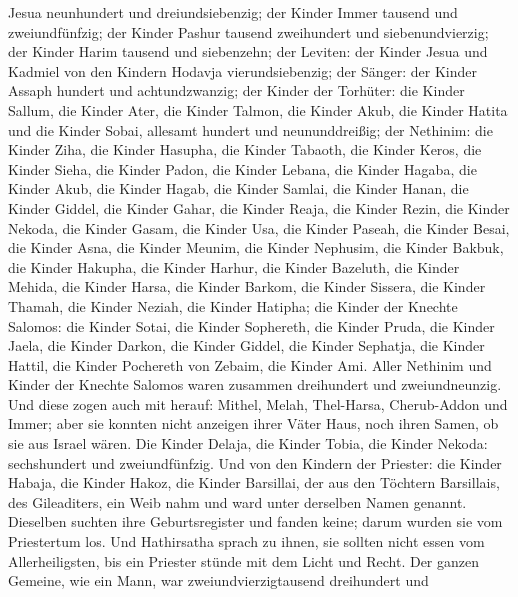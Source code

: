 Jesua neunhundert und dreiundsiebenzig;  der Kinder Immer
tausend und zweiundfünfzig;  der Kinder Pashur tausend
zweihundert und siebenundvierzig;  der Kinder Harim tausend
und siebenzehn;  der Leviten: der Kinder Jesua und Kadmiel
von den Kindern Hodavja vierundsiebenzig;  der Sänger: der
Kinder Assaph hundert und achtundzwanzig;  der Kinder der
Torhüter: die Kinder Sallum, die Kinder Ater, die Kinder Talmon, die
Kinder Akub, die Kinder Hatita und die Kinder Sobai, allesamt hundert
und neununddreißig;  der Nethinim: die Kinder Ziha, die
Kinder Hasupha, die Kinder Tabaoth,  die Kinder Keros, die
Kinder Sieha, die Kinder Padon,  die Kinder Lebana, die
Kinder Hagaba, die Kinder Akub,  die Kinder Hagab, die
Kinder Samlai, die Kinder Hanan,  die Kinder Giddel, die
Kinder Gahar, die Kinder Reaja,  die Kinder Rezin, die
Kinder Nekoda, die Kinder Gasam,  die Kinder Usa, die
Kinder Paseah, die Kinder Besai,  die Kinder Asna, die
Kinder Meunim, die Kinder Nephusim,  die Kinder Bakbuk, die
Kinder Hakupha, die Kinder Harhur,  die Kinder Bazeluth,
die Kinder Mehida, die Kinder Harsa,  die Kinder Barkom,
die Kinder Sissera, die Kinder Thamah,  die Kinder Neziah,
die Kinder Hatipha;  die Kinder der Knechte Salomos: die
Kinder Sotai, die Kinder Sophereth, die Kinder Pruda,  die
Kinder Jaela, die Kinder Darkon, die Kinder Giddel,  die
Kinder Sephatja, die Kinder Hattil, die Kinder Pochereth von Zebaim, die
Kinder Ami.  Aller Nethinim und Kinder der Knechte Salomos
waren zusammen dreihundert und zweiundneunzig.  Und diese
zogen auch mit herauf: Mithel, Melah, Thel-Harsa, Cherub-Addon und
Immer; aber sie konnten nicht anzeigen ihrer Väter Haus, noch ihren
Samen, ob sie aus Israel wären.  Die Kinder Delaja, die
Kinder Tobia, die Kinder Nekoda: sechshundert und zweiundfünfzig.
 Und von den Kindern der Priester: die Kinder Habaja, die
Kinder Hakoz, die Kinder Barsillai, der aus den Töchtern Barsillais, des
Gileaditers, ein Weib nahm und ward unter derselben Namen genannt.
 Dieselben suchten ihre Geburtsregister und fanden keine;
darum wurden sie vom Priestertum los.  Und Hathirsatha
sprach zu ihnen, sie sollten nicht essen vom Allerheiligsten, bis ein
Priester stünde mit dem Licht und Recht.  Der ganzen
Gemeine, wie ein Mann, war zweiundvierzigtausend dreihundert und
